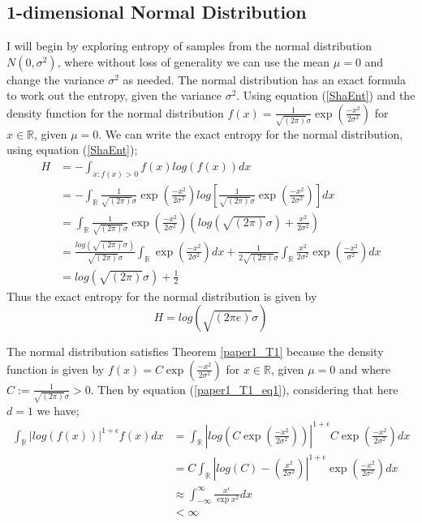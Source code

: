 \documentclass{article}
\begin{document}
\subsection{1-dimensional Normal Distribution} \label{Normal_d=1}
I will begin by exploring entropy of samples from the normal distribution $N(0, \sigma^2)$, where without loss of generality we can use the mean $\mu = 0$ and change the variance $\sigma^2$ as needed. The normal distribution has an exact formula to work out the entropy, given the variance $\sigma^2$. Using equation (\ref{ShaEnt}) and the density function for the normal distribution $f(x) = \frac{1}{\sqrt{(2\pi)} \sigma}\exp{ \left( \frac{-x^2}{2\sigma^2} \right)}$ for $x \in \mathbb{R}$, given $\mu = 0$. We can write the exact entropy for the normal distribution, using equation (\ref{ShaEnt});
\begin{align}
H &= - \int_{x : f(x) > 0} f(x) log(f(x)) dx \nonumber \\
&= - \int_{\mathbb{R}} \frac{1}{\sqrt{(2\pi)} \sigma}\exp{ \left( \frac{-x^2}{2\sigma^2} \right)} log \left[\frac{1}{\sqrt{(2\pi)} \sigma}\exp{ \left( \frac{-x^2}{2\sigma^2} \right)} \right] dx \nonumber \\
&=  \int_{\mathbb{R}} \frac{1}{\sqrt{(2\pi)} \sigma}\exp{ \left( \frac{-x^2}{2\sigma^2} \right)} \left( log(\sqrt{(2\pi)}\sigma) +  \frac{x^2}{2\sigma^2} \right) \nonumber \\
&= \frac{log(\sqrt{(2\pi)}\sigma)}{\sqrt{(2\pi)} \sigma} \int_{\mathbb{R}} \exp{ \left( \frac{-x^2}{2\sigma^2} \right)} dx +  \frac{1}{2\sqrt{(2\pi)} \sigma} \int_{\mathbb{R}} \frac{x^2}{2\sigma^2}  \exp{ \left( \frac{-x^2}{\sigma^2} \right)} dx \nonumber \\
&=  log(\sqrt{(2\pi)}\sigma) + \frac{1}{2} \nonumber 
\end{align}
Thus the exact entropy for the normal distribution is given by 
\begin{equation}\label{NormalEnt}
H =  log(\sqrt{(2\pi e)}\sigma) 
\end{equation}

The normal distribution satisfies Theorem \ref{paper1_T1} because the density function is given by $f(x) = C \exp{ \left( \frac{-x^2}{2\sigma^2} \right)}$ for $x \in \mathbb{R}$, given $\mu = 0$ and where $C:= \frac{1}{\sqrt{(2\pi)} \sigma} > 0$. Then by equation (\ref{paper1_T1_eq1}), considering that here $d=1$ we have;
\begin{align}
\int_{\mathbb{R}} | log(f(x))|^{1 + \epsilon} f(x) dx  &= \int_{\mathbb{R}} \left| log\left( C\exp{ \left( \frac{-x^2}{2\sigma^2} \right)} \right) \right|^{1 + \epsilon}C\exp{ \left( \frac{-x^2}{2\sigma^2} \right)} dx \\ \nonumber
&= C \int_{\mathbb{R}} \left| log \left( C \right) -  \left( \frac{x^2}{2\sigma^2} \right) \right|^{1 + \epsilon} \exp{ \left( \frac{-x^2}{2\sigma^2} \right)} dx \\ \nonumber
&\approx \int_{-\infty}^{\infty} \frac{x^{\epsilon}}{ \exp{x^2}} dx \\ \nonumber
&< \infty
\end{align}
\end{document}
